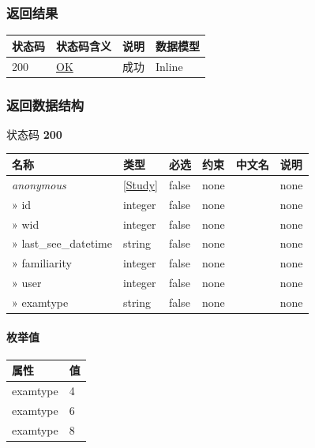 \documentclass[
]{article}
\begin{document}
\hypertarget{ux8fd4ux56deux7ed3ux679c-44}{%
\subsubsection{返回结果}\label{ux8fd4ux56deux7ed3ux679c-44}}

\begin{longtable}[]{@{}llll@{}}
\toprule
状态码 & 状态码含义 & 说明 & 数据模型 \\
\midrule
\endhead
200 & \href{https://tools.ietf.org/html/rfc7231\#section-6.3.1}{OK} &
成功 & Inline \\
\bottomrule
\end{longtable}

\hypertarget{ux8fd4ux56deux6570ux636eux7ed3ux6784-36}{%
\subsubsection{返回数据结构}\label{ux8fd4ux56deux6570ux636eux7ed3ux6784-36}}

状态码 \textbf{200}

\begin{longtable}[]{@{}llllll@{}}
\toprule
名称 & 类型 & 必选 & 约束 & 中文名 & 说明 \\
\midrule
\endhead
\emph{anonymous} & {[}\protect\hyperlink{schemastudy}{Study}{]} & false
& none & & none \\
» id & integer & false & none & & none \\
» wid & integer & false & none & & none \\
» last\_see\_datetime & string & false & none & & none \\
» familiarity & integer & false & none & & none \\
» user & integer & false & none & & none \\
» examtype & string & false & none & & none \\
\bottomrule
\end{longtable}

\hypertarget{ux679aux4e3eux503c-6}{%
\paragraph{枚举值}\label{ux679aux4e3eux503c-6}}

\begin{longtable}[]{@{}ll@{}}
\toprule
属性 & 值 \\
\midrule
\endhead
examtype & 4 \\
examtype & 6 \\
examtype & 8 \\
\bottomrule
\end{longtable}
\end{document}
